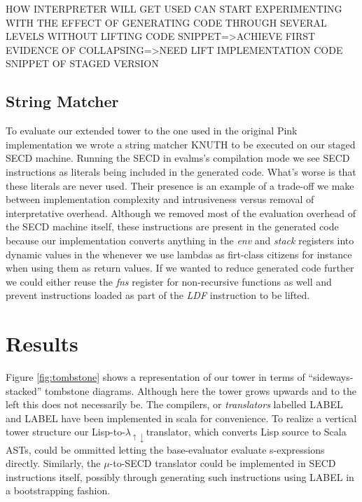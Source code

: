 \documentclass{article}
\theoremstyle{definition}
\newcommand{\mslang}{$\lambda_{\uparrow\downarrow}$}
\begin{document}
HOW INTERPRETER WILL GET USED
CAN START EXPERIMENTING WITH THE EFFECT OF GENERATING CODE THROUGH SEVERAL LEVELS
WITHOUT LIFTING CODE SNIPPET=>ACHIEVE FIRST EVIDENCE  OF COLLAPSING=>NEED LIFT
IMPLEMENTATION
CODE SNIPPET OF STAGED VERSION



\subsection{String Matcher}
To evaluate our extended tower to the one used in the original Pink implementation we wrote a string matcher KNUTH to be executed on our staged SECD machine. Running the SECD in evalms's compilation mode we see SECD instructions as literals being included in the generated code. What's worse is that these literals are never used. Their presence is an example of a trade-off we make between implementation complexity and intrusiveness versus removal of interpretative overhead. Although we removed most of the evaluation overhead of the SECD machine itself, these instructions are present in the generated code because our implementation converts anything in the \textit{env} and \textit{stack} registers into dynamic values in the whenever we use lambdas as firt-class citizens for instance when using them as return values. If we wanted to reduce generated code further we could either reuse the \textit{fns} register for non-recursive functions as well and prevent instructions loaded as part of the \textit{LDF} instruction to be lifted.

\section{Results}
Figure \ref{fig:tombstone} shows a representation of our tower in terms of ``sideways-stacked'' tombstone diagrams. Although here the tower grows upwards and to the left this does not necessarily be. The compilers, or \textit{translators} labelled LABEL and LABEL have been implemented in scala for convenience. To realize a vertical tower structure our Lisp-to-\mslang translator, which converts Lisp source to Scala ASTs, could be ommitted letting the base-evaluator evaluate s-expressions directly. Similarly, the $\mu$-to-SECD translator could be implemented in SECD instructions itself, possibly through generating such instructions using LABEL in a bootstrapping fashion.
\end{document}
